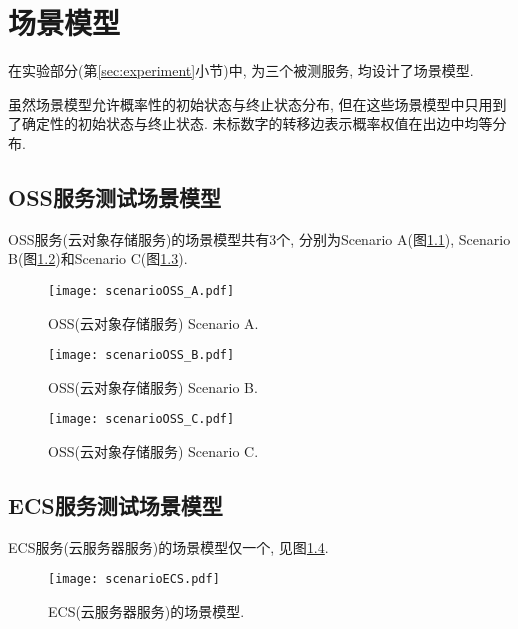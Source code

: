 \chapter{场景模型}

    在实验部分(第\ref{sec:experiment}小节)中, 为三个被测服务, 均设计了场景模型.
    
    虽然场景模型允许概率性的初始状态与终止状态分布, 但在这些场景模型中只用到了确定性的初始状态与终止状态. 未标数字的转移边表示概率权值在出边中均等分布.
    
    \section{OSS服务测试场景模型}
        OSS服务(云对象存储服务)的场景模型共有3个, 分别为Scenario A(图\ref{fig:oss_scenario_A}), Scenario B(图\ref{fig:oss_scenario_B})和Scenario C(图\ref{fig:oss_scenario_C}).
        
        \begin{figure}[!htb]
            \centering
            \texttt{[image: scenarioOSS\_A.pdf]}
            \caption[]{OSS(云对象存储服务) Scenario A.}
            \label{fig:oss_scenario_A}
        \end{figure}
        
         \begin{figure}[!htb]
            \centering
            \texttt{[image: scenarioOSS\_B.pdf]}
            \caption[]{OSS(云对象存储服务) Scenario B.}
            \label{fig:oss_scenario_B}
        \end{figure}
        
         \begin{figure}[!htb]
            \centering
            \texttt{[image: scenarioOSS\_C.pdf]}
            \caption[]{OSS(云对象存储服务) Scenario C.}
            \label{fig:oss_scenario_C}
        \end{figure}
    
    \section{ECS服务测试场景模型}
        ECS服务(云服务器服务)的场景模型仅一个, 见图\ref{fig:ecs_scenario}.
        
        \begin{figure}[!htb]
            \centering
            \texttt{[image: scenarioECS.pdf]}
            \caption[]{ECS(云服务器服务)的场景模型.}
            \label{fig:ecs_scenario}
        \end{figure}
        
